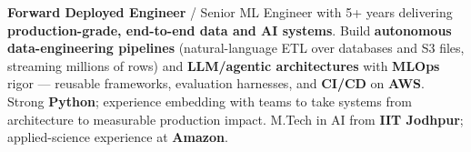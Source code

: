 \documentclass[letter,10pt]{article}
\begin{document}

\textbf{Forward Deployed Engineer} / Senior ML Engineer with 5+ years delivering \textbf{production-grade, end-to-end data and AI systems}.
Build \textbf{autonomous data-engineering pipelines} (natural-language ETL over databases and S3 files, streaming millions of rows) and \textbf{LLM/agentic architectures} with \textbf{MLOps} rigor --- reusable frameworks, evaluation harnesses, and \textbf{CI/CD} on \textbf{AWS}.
Strong \textbf{Python}; experience embedding with teams to take systems from architecture to measurable production impact.
M.Tech in AI from \textbf{IIT Jodhpur}; applied-science experience at \textbf{Amazon}.
\end{document}

